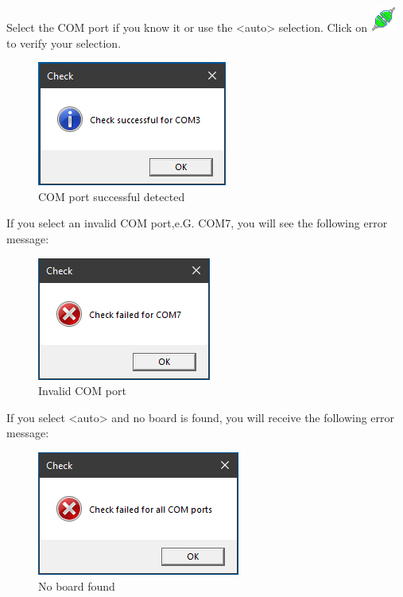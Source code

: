 \documentclass[11pt,a4paper]{article}
\begin{document}
Select the COM port if you know it or use the <auto> selection.
Click on \includegraphics[scale=0.5]{connect.png} to verify your selection.

\begin{figure}[H]
	\centering
	\includegraphics[scale=1.0]{MillenniumChessLink3.png}
	\caption{COM port successful detected }
	\label{fig:MillenniumChessLink3}
\end{figure}

If you select an invalid COM port,e.G. COM7, you will see the following error message:

\begin{figure}[H]
	\centering
	\includegraphics[scale=1.0]{MillenniumChessLink4.png}
	\caption{Invalid COM port }
	\label{fig:MillenniumChessLink4}
\end{figure}

If you select <auto> and no board is found, you will receive the following error message:

\begin{figure}[H]
	\centering
	\includegraphics[scale=1.0]{MillenniumChessLink5.png}
	\caption{No board found }
	\label{fig:MillenniumChessLink5}
\end{figure}
\end{document}
